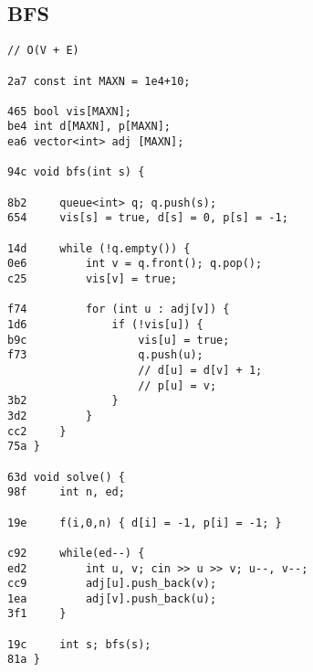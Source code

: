 \documentclass[11pt, a4paper, twoside]{article}
\begin{document}
\subsection{BFS}
\begin{lstlisting}
// O(V + E)

2a7 const int MAXN = 1e4+10;

465 bool vis[MAXN];
be4 int d[MAXN], p[MAXN];
ea6 vector<int> adj [MAXN];

94c void bfs(int s) {
    
8b2     queue<int> q; q.push(s);
654     vis[s] = true, d[s] = 0, p[s] = -1;
    
14d     while (!q.empty()) {
0e6         int v = q.front(); q.pop(); 
c25         vis[v] = true;
            
f74         for (int u : adj[v]) {
1d6             if (!vis[u]) {
b9c                 vis[u] = true;
f73                 q.push(u);
                    // d[u] = d[v] + 1;
                    // p[u] = v;
3b2             }
3d2         }
cc2     }
75a }

63d void solve() {
98f     int n, ed; 
        
19e 	f(i,0,n) { d[i] = -1, p[i] = -1; }    
    	
c92 	while(ed--) {
ed2         int u, v; cin >> u >> v; u--, v--;
cc9         adj[u].push_back(v);
1ea         adj[v].push_back(u);
3f1     }
    
19c 	int s; bfs(s);
81a }
\end{lstlisting}
\end{document}
